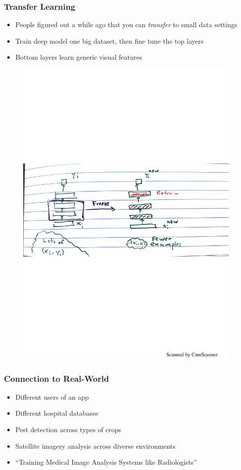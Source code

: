 \documentclass[10pt,mathserif]{beamer}
\begin{document}
\begin{frame}
  \frametitle{Transfer Learning}
  \begin{itemize}\itemsep=12pt
  \item People figured out a while ago that you can \textit{transfer} to small
    data settings
  \item Train deep model one big dataset, then fine tune the top layers
  \item Bottom layers learn generic visual features
  \end{itemize}
  \begin{figure}
    \includegraphics[width=0.6\paperwidth]{figure/transfer_drawing}
  \end{figure}
\end{frame}

\begin{frame}
  \frametitle{Connection to Real-World}
  \begin{itemize}
  \item Different users of an app
  \item Different hospital databases
  \item Pest detection across types of crops
  \item Satellite imagery analysis across diverse environments
  \item ``Training Medical Image Analysis Systems like Radiologists''
  \end{itemize}
\end{frame}
\end{document}
